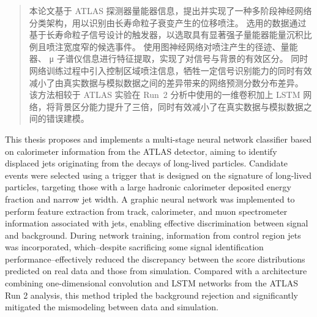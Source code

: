

\begin{abstract}
  本论文基于 ATLAS 探测器量能器信息，提出并实现了一种多阶段神经网络分类架构，用以识别由长寿命粒子衰变产生的位移喷注。
  选用的数据通过基于长寿命粒子信号设计的触发器，以选取具有显著强子量能器能量沉积比例且喷注宽度窄的候选事件。
  使用图神经网络对喷注产生的径迹、量能器、 μ 子谱仪信息进行特征提取，实现了对信号与背景的有效区分。
  同时网络训练过程中引入控制区域喷注信息，牺牲一定信号识别能力的同时有效减小了由真实数据与模拟数据之间的差异带来的网络预测分数分布差异。
  该方法相较于 ATLAS 实验在 Run~2 分析中使用的一维卷积加上 LSTM 网络，将背景区分能力提升了三倍，同时有效减小了在真实数据与模拟数据之间的错误建模。
\end{abstract}

\begin{abstract*}
  This thesis proposes and implements a multi-stage neural network classifier based on calorimeter information from the ATLAS detector,
  aiming to identify displaced jets originating from the decays of long-lived particles.
  Candidate events were selected using a trigger that is designed on the signature of long-lived particles,
  targeting those with a large hadronic calorimeter deposited energy fraction and narrow jet width.
  A graphic neural network was implemented to perform feature extraction from track, calorimeter,
  and muon spectrometer information associated with jets, enabling effective discrimination between signal and background.
  During network training, information from control region jets was incorporated,
  which--despite sacrificing some signal identification performance--effectively reduced the discrepancy
  between the score distributions predicted on real data and those from simulation.
  Compared with a architecture combining one-dimensional convolution and LSTM networks from the ATLAS Run 2 analysis,
  this method tripled the background rejection and significantly mitigated the mismodeling between data and simulation.
\end{abstract*}
